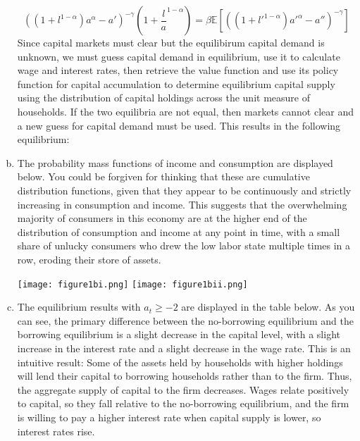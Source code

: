 \documentclass{article}
\newcommand{\E}[1]{\mathbb{E}\left[#1\right]} %
\begin{document}
\begin{enumerate}[(a)]
{\[		\]
		}%
		\[
			\left((1+l^{1-\alpha})a^\alpha - a'\right)^{-\gamma}\left(1+\frac{l}{a}^{1-\alpha}\right) = 
			\beta\E{\left((1+l'^{1-\alpha})a'^\alpha - a''\right)^{-\gamma}}
		\]
		Since capital markets must clear but the equilibirum capital demand is unknown, we must guess capital demand in equilibrium, use it to calculate wage and interest rates, then retrieve the value function and use its policy function for capital accumulation to determine equilibrium capital supply using the distribution of capital holdings across the unit measure of households. If the two equilibria are not equal, then markets cannot clear and a new guess for capital demand must be used. This results in the following equilibrium:
			
	
	\item The probability mass functions of income and consumption are displayed below. You could be forgiven for thinking that these are cumulative distribution functions, given that they appear to be continuously and strictly increasing in consumption and income. This suggests that the overwhelming majority of consumers in this economy are at the higher end of the distribution of consumption and income at any point in time, with a small share of unlucky consumers who drew the low labor state multiple times in a row, eroding their store of assets. 
		\begin{center}
			\texttt{[image: figure1bi.png]}
			\texttt{[image: figure1bii.png]}
		\end{center}
	
	
	\item The equilibrium results with ${a_t\geq-2}$ are displayed in the table below. As you can see, the primary difference between the no-borrowing equilibrium and the borrowing equilibrium is a slight decrease in the capital level, with a slight increase in the interest rate and a slight decrease in the wage rate. This is an intuitive result: Some of the assets held by households with higher holdings will lend their capital to borrowing households rather than to the firm. Thus, the aggregate supply of capital to the firm decreases. Wages relate positively to capital, so they fall relative to the no-borrowing equilibrium, and the firm is willing to pay a higher interest rate when capital supply is lower, so interest rates rise.
		
	
	
\end{enumerate}

\end{document}
